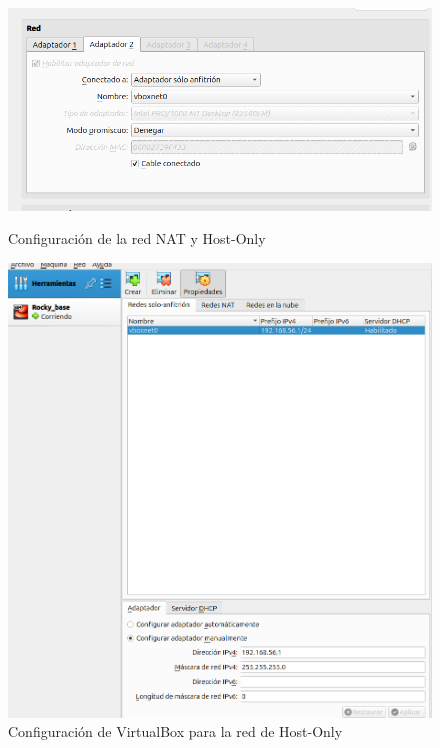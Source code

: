 \begin{figure}[htbp]
    \centering
    \begin{minipage}[b]{0.45\textwidth}
        \centering
        \includegraphics[width=\textwidth]{images/Bloque1/adaptador2.png}
        \caption{Configuración de la red NAT y Host-Only}
    \end{minipage}
    \hfill
    \begin{minipage}[b]{0.45\textwidth}
        \centering
        \includegraphics[width=\textwidth]{images/Bloque1/vbox.png}
        \caption{Configuración de VirtualBox para la red de Host-Only}
    \end{minipage}
\end{figure}

